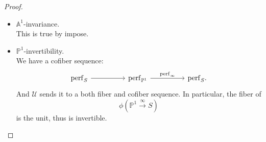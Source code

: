 \documentclass[10pt,a4paper]{amsart}
\newcommand{\on}{\operatorname}
\begin{document}
\begin{proof}
\begin{itemize}
\[\begin{tikzcd}
	{\mathcal{U}(\on{perf}_X)} && {\mathcal{U}(\on{perf}_U)} \\
	\\
	{\mathcal{U}(\on{perf}_V)} && {\mathcal{U}(\on{perf}_W)}
	\arrow[from=1-1, to=1-3]
	\arrow[from=1-1, to=3-1]
	\arrow[from=1-3, to=3-3]
	\arrow[from=3-1, to=3-3]
\end{tikzcd}\]
is a pullback as desired.
\item $\mathbb{A}^1$-invariance.\\
This is true by impose.
\item $\mathbb{P}^1$-invertibility.\\
We have a cofiber sequence:
\[\begin{tikzcd}
	{\on{perf}_S} && {\on{perf}_{\mathbb{P}^1}} && {\on{perf}_S}
	\arrow[from=1-1, to=1-3]
	\arrow["\on{perf}_\infty", from=1-3, to=1-5].
\end{tikzcd}\]
And $\mathcal{U}$ sends it to a both fiber and cofiber sequence. In particular, the fiber of \[\phi(\mathbb{P}^1\xrightarrow{\infty} S)\] is the unit, thus is invertible.
\end{itemize}
\end{proof}
\end{document}

